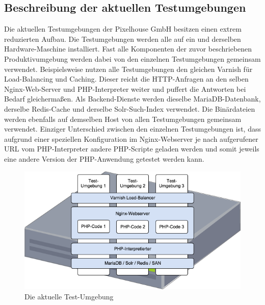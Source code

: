 \subsection{Beschreibung der aktuellen Testumgebungen}

Die aktuellen Testumgebungen der Pixelhouse GmbH besitzen einen extrem reduzierten Aufbau. Die Testumgebungen werden alle auf ein und derselben Hardware-Maschine installiert. Fast alle Komponenten der zuvor beschriebenen Produktivumgebung werden dabei von den einzelnen Testumgebungen gemeinsam verwendet. Beispielsweise nutzen alle Testumgebungen den gleichen Varnish für Load-Balancing und Caching. Dieser reicht die HTTP-Anfragen an den selben Nginx-Web-Server und PHP-Interpreter weiter und puffert die Antworten bei Bedarf gleichermaßen. Als Backend-Dienste werden dieselbe MariaDB-Datenbank, derselbe Redis-Cache und derselbe Solr-Such-Index verwendet. Die Binärdateien werden ebenfalls auf demselben Host von allen Testumgebungen gemeinsam verwendet. Einziger Unterschied zwischen den einzelnen Testumgebungen ist, dass aufgrund einer speziellen Konfiguration im Nginx-Webserver je nach aufgerufener URL vom PHP-Interpreter andere PHP-Scripte geladen werden und somit jeweils eine andere Version der PHP-Anwendung getestet werden kann.

\begin{figure}[!ht]
  \begin{center}
    \includegraphics[width=14cm]{bilder/Aktuelle-Testumgebung.png}
    \caption{Die aktuelle Test-Umgebung}
  \end{center}
\end{figure}

